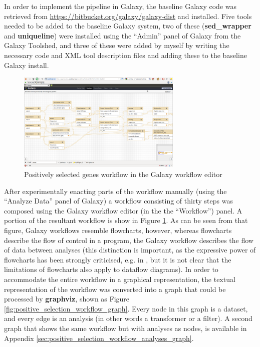 \documentclass[a4paper,10pt]{scrreprt}
\begin{document}
In order to implement the pipeline in Galaxy, the baseline Galaxy code was retrieved from \url{https://bitbucket.org/galaxy/galaxy-dist} and installed. Five tools needed to be added to the baseline Galaxy system, two of these (\textbf{sed\_wrapper} and \textbf{uniqueline}) were installed using the ``Admin'' panel of Galaxy from the Galaxy Toolshed, and three of these were added by myself by writing the necessary code and XML tool description files and adding these to the baseline Galaxy install.

\begin{figure}[!htb]
\centering
\includegraphics[width=0.7\textwidth]{images/GalaxyPositiveSelectionPipeline.png}
\caption{Positively selected genes workflow in the Galaxy workflow editor}
\label{fig:GalaxyPositiveSelectionPipeline}
\end{figure}

After experimentally enacting parts of the workflow manually (using the ``Analyze Data'' panel of Galaxy) a workflow consisting of thirty steps was composed using the Galaxy workflow editor (in the the ``Workflow'') panel. A portion of the resultant workflow is show in Figure \ref{fig:GalaxyPositiveSelectionPipeline}. As can be seen from that figure, Galaxy workflows resemble flowcharts, however, whereas flowcharts describe the flow of control in a program, the Galaxy workflow describes the flow of data between analyses (this distinction is important, as the expressive power of flowcharts has been strongly criticised, e.g. in \cite{brooks_mythical_1995}, but it is not clear that the limitations of flowcharts also apply to dataflow diagrams). In order to accommodate the entire workflow in a graphical representation, the textual representation of the workflow was converted into a graph that could be processed by \textbf{graphviz}, shown as Figure \ref{fig:positive_selection_workflow_graph}. Every node in this 
graph is a dataset, and every edge is an analysis (in other words a transformer or a filter). A second graph that shows the same workflow but with analyses as nodes, is available in Appendix \ref{sec:positive_selection_workflow_analyses_graph}.
\end{document}
